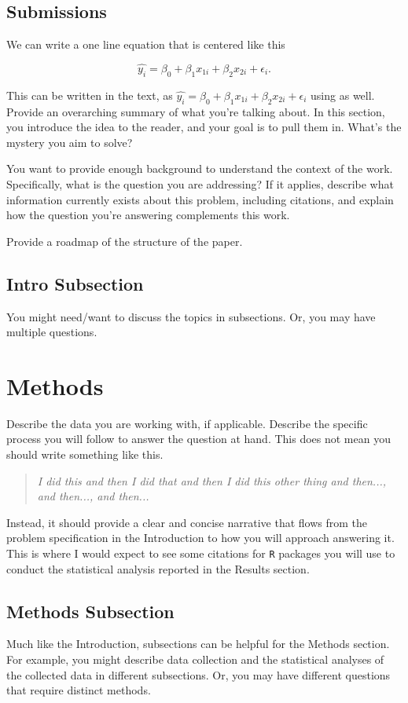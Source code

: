 \documentclass{article}\usepackage[]{graphicx}\usepackage[]{xcolor}
\begin{document}
\begin{multicols}{2}
\subsection{Submissions}
We can write a one line equation that is centered like this 
\begin{center}
\[\widehat{y_i} = \beta_0 + \beta_1 x_{1i}+ \beta_2 x_{2i} + \epsilon_i.\]
\end{center}
This can be written in the text, as $\widehat{y_i} = \beta_0 + \beta_1 x_{1i}+ \beta_2 x_{2i} + \epsilon_i$ using as well.
\\ 
Provide an overarching summary of what you're talking about. In this section, you introduce the idea to the reader, and your goal is to pull them in. What's the mystery you aim to solve?

You want to provide enough background to understand the context of the work. Specifically, what is the question you are addressing? If it applies, describe what information currently exists about this problem, including citations, and explain how the question you're answering complements this work.

Provide a roadmap of the structure of the paper. 

\subsection{Intro Subsection}
You might need/want to discuss the topics in subsections. Or, you may have multiple questions.


\section{Methods}
Describe the data you are working with, if applicable. Describe the specific process you will follow to answer the question at hand. This does not mean you should write something like this.
\begin{quote}
\textit{I did this and then I did that and then I did this other thing and then..., and then..., and then...}
\end{quote}
Instead, it should provide a clear and concise narrative that flows from the problem specification in the Introduction to how you will approach answering it. This is where I would expect to see some citations for \texttt{R} packages you will use to conduct the statistical analysis reported in the Results section.


\subsection{Methods Subsection}
Much like the Introduction, subsections can be helpful for the Methods section. For example, you might describe data collection and the statistical analyses of the collected data in different subsections. Or, you may have different questions that require distinct methods. 


\end{multicols}
\end{document}
